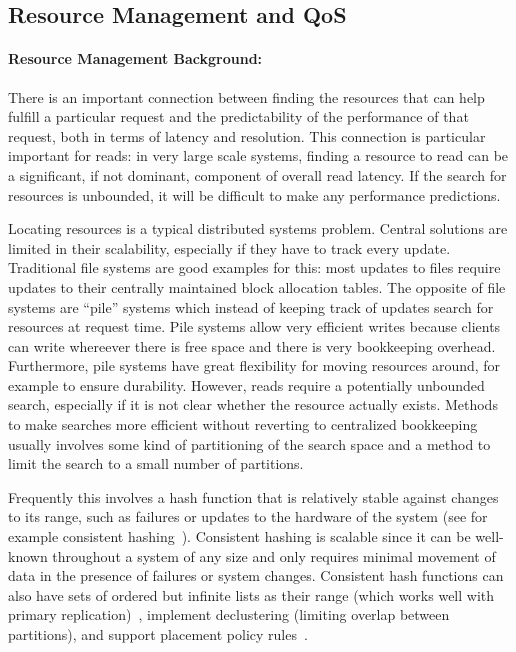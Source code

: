 \subsection{Resource Management and QoS}

\paragraph{Resource Management Background:} There is an important connection between finding the resources that can help fulfill a particular request and the predictability of the performance of that request, both in terms of latency and resolution. This connection is particular important for reads: in very large scale systems, finding a resource to read can be a significant, if not dominant, component of overall read latency. If the search for resources is unbounded, it will be difficult to make any performance predictions. 

Locating resources is a typical distributed systems problem. Central solutions are limited in their scalability, especially if they have to track every update. Traditional file systems are good examples for this: most updates to files require updates to their centrally maintained block allocation tables. The opposite of file systems are ``pile'' systems which instead of keeping track of updates search for resources at request time. Pile systems allow very efficient writes because clients can write whereever there is free space and there is very bookkeeping overhead. Furthermore, pile systems have great flexibility for moving resources around, for example to ensure durability. However, reads require a potentially unbounded search, especially if it is not clear whether the resource actually exists. Methods to make searches more efficient without reverting to centralized bookkeeping usually involves some kind of partitioning of the search space and a method to limit the search to a small number of partitions. 

Frequently this involves a hash function that is relatively stable against changes to its range, such as failures or updates to the hardware of the system (see for example consistent hashing~\cite{karger:stoc97}). Consistent hashing is scalable since it can be well-known throughout a system of any size and only requires minimal movement of data in the presence of failures or system changes. Consistent hash functions can also have sets of ordered but infinite lists as their range (which works well with primary replication)~\cite{honicky:ipdps04}, implement declustering (limiting overlap between partitions), and support placement policy rules~\cite{weil:sc06}.

